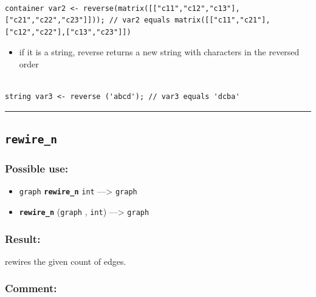 \documentclass[]{book}
\providecommand{\tightlist}{%
  \setlength{\itemsep}{0pt}\setlength{\parskip}{0pt}}
\theoremstyle{definition}
\theoremstyle{definition}
\theoremstyle{definition}
\theoremstyle{remark}
\begin{document}
\begin{verbatim}
 
container var2 <- reverse(matrix([["c11","c12","c13"],["c21","c22","c23"]])); // var2 equals matrix([["c11","c21"],["c12","c22"],["c13","c23"]])
\end{verbatim}

\begin{itemize}
\tightlist
\item
  if it is a string, reverse returns a new string with characters in the
  reversed order
\end{itemize}

\begin{verbatim}
 
string var3 <- reverse ('abcd'); // var3 equals 'dcba'
\end{verbatim}

\begin{center}\rule{0.5\linewidth}{\linethickness}\end{center}

\subsection{\texorpdfstring{\texttt{rewire\_n}}{rewire\_n}}\label{rewire_n}

\subsubsection{Possible use:}\label{possible-use-436}

\begin{itemize}
\tightlist
\item
  \texttt{graph} \textbf{\texttt{rewire\_n}} \texttt{int}
  ---\textgreater{} \texttt{graph}
\item
  \textbf{\texttt{rewire\_n}} (\texttt{graph} , \texttt{int})
  ---\textgreater{} \texttt{graph}
\end{itemize}

\subsubsection{Result:}\label{result-422}

rewires the given count of edges.

\subsubsection{Comment:}\label{comment-84}
\end{document}
